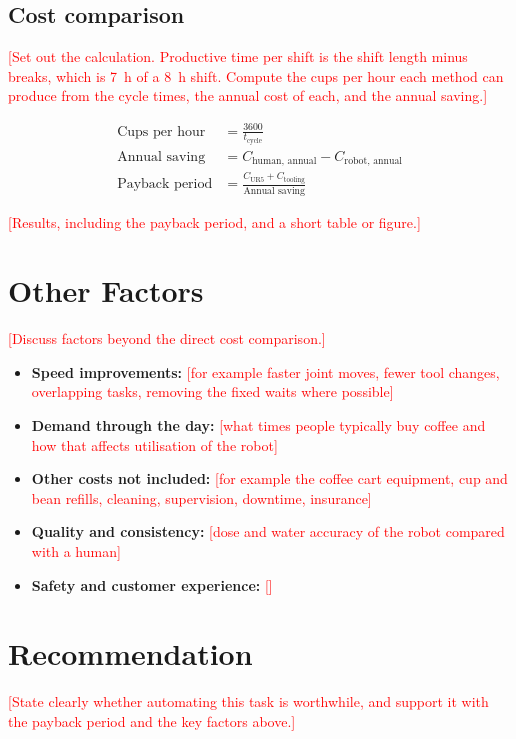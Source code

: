 \documentclass[11pt,a4paper]{article}
\newcommand{\todo}[1]{\textcolor{red}{[#1]}}
\begin{document}
\subsection{Cost comparison}
\todo{Set out the calculation. Productive time per shift is the shift length
minus breaks, which is \SI{7}{\hour} of a \SI{8}{\hour} shift. Compute the
cups per hour each method can produce from the cycle times, the annual
cost of each, and the annual saving.}

\begin{align}
\text{Cups per hour} &= \frac{3600}{t_{\text{cycle}}} \\
\text{Annual saving} &= C_{\text{human, annual}} - C_{\text{robot, annual}} \\
\text{Payback period} &= \frac{C_{\text{UR5}} + C_{\text{tooling}}}{\text{Annual saving}}
\end{align}

\todo{Results, including the payback period, and a short table or figure.}

\section{Other Factors}
\todo{Discuss factors beyond the direct cost comparison.}

\begin{itemize}
    \item \textbf{Speed improvements:} \todo{for example faster joint moves,
    fewer tool changes, overlapping tasks, removing the fixed waits where
    possible}
    \item \textbf{Demand through the day:} \todo{what times people typically
    buy coffee and how that affects utilisation of the robot}
    \item \textbf{Other costs not included:} \todo{for example the coffee cart
    equipment, cup and bean refills, cleaning, supervision, downtime,
    insurance}
    \item \textbf{Quality and consistency:} \todo{dose and water accuracy of
    the robot compared with a human}
    \item \textbf{Safety and customer experience:} \todo{}
\end{itemize}

\section{Recommendation}
\todo{State clearly whether automating this task is worthwhile, and support it
with the payback period and the key factors above.}
\end{document}
